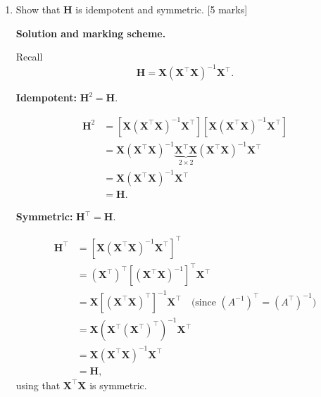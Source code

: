 \documentclass{article}
\begin{document}
\begin{enumerate}[label=(\alph*)]
\begin{mdframed}[linecolor=black, linewidth=1pt]
    \textbf{Marks (3):}
    \begin{itemize}
      \item 1 mark: starts from $\hat{\underline{y}} = \bm{X}\hat{\underline{\beta}}$.
      \item 1 mark: substitutes $\hat{\underline{\beta}}$ from part (b) to get $\hat{\underline{y}} = \bm{X}(\bm{X}^{\top}\bm{X})^{-1}\bm{X}^{\top}\underline{y}$.
      \item 1 mark: defines $\bm{H}$ and states $\hat{\underline{y}}=\bm{H}\underline{y}$.
    \end{itemize}
    \end{mdframed}

    \item Show that $\bm{H}$ is idempotent and symmetric. [5 marks]
    
    \begin{mdframed}[linecolor=black, linewidth=1pt]
    \textbf{Solution and marking scheme.}

    Recall
    \[
    \bm{H} = \bm{X}(\bm{X}^{\top}\bm{X})^{-1}\bm{X}^{\top}.
    \]
    
    \textbf{Idempotent:} $\bm{H}^2=\bm{H}$.
    
    \[
    \begin{aligned}
    \bm{H}^2
    &= \left[ \bm{X}(\bm{X}^{\top}\bm{X})^{-1}\bm{X}^{\top} \right]
       \left[ \bm{X}(\bm{X}^{\top}\bm{X})^{-1}\bm{X}^{\top} \right] \\
    &= \bm{X}(\bm{X}^{\top}\bm{X})^{-1}
       \underbrace{\bm{X}^{\top}\bm{X}}_{2\times 2}
       (\bm{X}^{\top}\bm{X})^{-1}\bm{X}^{\top}\\
    &= \bm{X}(\bm{X}^{\top}\bm{X})^{-1}\bm{X}^{\top}\\
    &= \bm{H}.
    \end{aligned}
    \]
    
    \textbf{Symmetric:} $\bm{H}^{\top}=\bm{H}$.
    
    \[
    \begin{aligned}
    \bm{H}^{\top}
    &= \left[\bm{X}(\bm{X}^{\top}\bm{X})^{-1}\bm{X}^{\top}\right]^{\top}\\
    &= \left(\bm{X}^{\top}\right)^{\top}
       \left[(\bm{X}^{\top}\bm{X})^{-1}\right]^{\top}
       \bm{X}^{\top}\\
    &= \bm{X}\left[(\bm{X}^{\top}\bm{X})^{\top}\right]^{-1}\bm{X}^{\top}
      \quad\text{(since $(A^{-1})^{\top}=(A^{\top})^{-1}$)}\\
    &= \bm{X}(\bm{X}^{\top}(\bm{X}^\top)^\top)^{-1}\bm{X}^{\top}\\
    &= \bm{X}(\bm{X}^{\top}\bm{X})^{-1}\bm{X}^{\top}\\
    &= \bm{H},
    \end{aligned}
    \]
    using that $\bm{X}^{\top}\bm{X}$ is symmetric.
    

\end{mdframed}
\end{enumerate}
\end{document}
